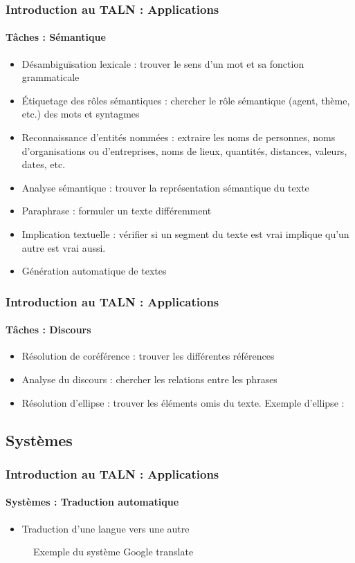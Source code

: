 \documentclass[xcolor=table]{beamer}
\begin{document}
\begin{frame}
\frametitle{Introduction au TALN : Applications}
\framesubtitle{Tâches : Sémantique}

\begin{itemize}
	\item Désambiguïsation lexicale : trouver le sens d'un mot et sa fonction grammaticale
	\item Étiquetage des rôles sémantiques : chercher le rôle sémantique (agent, thème, etc.) des mots et syntagmes
	\item Reconnaissance d'entités nommées : extraire les noms de personnes, noms d'organisations ou d'entreprises, noms de lieux, quantités, distances, valeurs, dates, etc.
	\item Analyse sémantique : trouver la représentation sémantique du texte
	\item Paraphrase : formuler un texte différemment 
	\item Implication textuelle : vérifier si un segment du texte est vrai implique qu'un autre est vrai aussi.
	\item Génération automatique de textes
\end{itemize}

\end{frame}

\begin{frame}
\frametitle{Introduction au TALN : Applications}
\framesubtitle{Tâches : Discours}

\begin{itemize}
	\item Résolution de coréférence : trouver les différentes références
	\item Analyse du discours : chercher les relations entre les phrases
	\item Résolution d'ellipse : trouver les éléments omis du texte. Exemple d'ellipse : 
\end{itemize}

\end{frame}

\subsection{Systèmes}

\begin{frame}
\frametitle{Introduction au TALN : Applications}
\framesubtitle{Systèmes : Traduction automatique}

\begin{itemize}
	\item Traduction d'une langue vers une autre
\end{itemize}

\begin{figure}
	\caption{Exemple du système Google translate}
\end{figure}

\end{frame}
\end{document}
